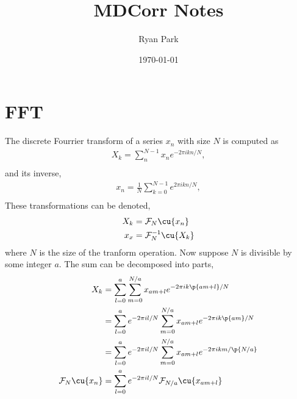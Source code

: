 \documentclass[11pt, a4paper]{article}
\title{MDCorr Notes}
\author{Ryan Park}
\date{\today}
\begin{document}

\maketitle
\tableofcontents
\renewcommand{\vec}[1]{\boldsymbol{#1}}

\section{FFT}

The discrete Fourrier transform of a series $x_{n}$ with size $N$ is computed as
\begin{equation}\begin{aligned}
    X_{k} = \sum_{n}^{N-1} x_{n} e^{-2 \pi i k n / N}, \\
\end{aligned}\end{equation}
and its inverse,
\begin{equation}\begin{aligned}
    x_{n} = \frac{1}{N}\sum_{k=0}^{N-1} e^{2 \pi i k n /N}, \\
\end{aligned}\end{equation}
These transformations can be denoted,
\begin{equation}\begin{aligned}
    X_{k} &= \mathcal{F}_{N}\cu{x_{n}} \\
    x_{x} &= \mathcal{F}_{N}^{-1}\cu{X_{k}} \\
\end{aligned}\end{equation}
where $N$ is the size of the tranform operation.
Now suppose $N$ is divisible by some integer $a$.
The sum can be decomposed into parts,
\begin{equation}\begin{aligned}
    X_{k}
    &= \sum_{l=0}^{a} \sum_{m=0}^{ N/a } x_{am + l} e^{-2 \pi i k \p{am + l} / N} \\
    &= \sum_{l=0}^{a} e^{-2 \pi i l/N}\sum_{m=0}^{ N/a } x_{am + l} e^{-2 \pi i k \p{am} / N} \\
    &= \sum_{l=0}^{a} e^{-2 \pi i l/N}\sum_{m=0}^{ N/a } x_{am + l} e^{-2 \pi i k m / \p{N/a}} \\
    \mathcal{F}_{N} \cu{x_{n}} &= \sum_{l=0}^{a} e^{-2 \pi i l/N} \mathcal{F}_{N/a} \cu{x_{a m + l}} \\
\end{aligned}\end{equation}
\end{document}
